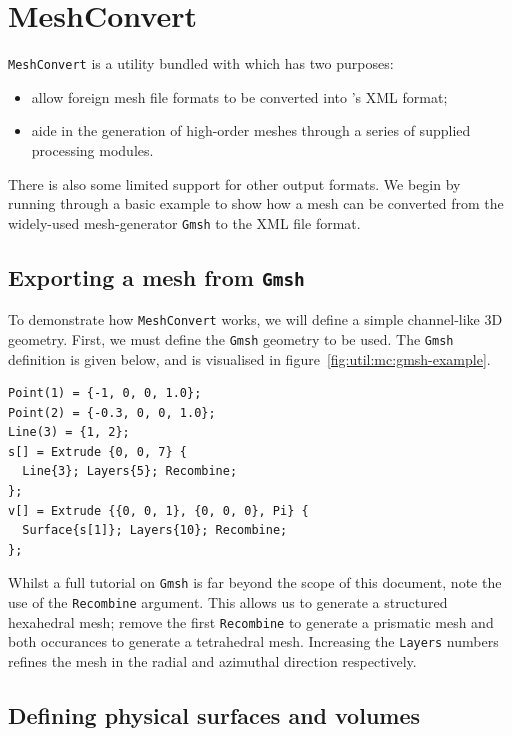 \section{MeshConvert}
\label{s:utilities:meshconvert}

\newcommand{\mc}{\texttt{MeshConvert}\xspace}
\newcommand{\gmsh}{\texttt{Gmsh}\xspace}

\mc is a utility bundled with \nekpp which has two purposes:
\begin{itemize}
  \item allow foreign mesh file formats to be converted into \nekpp's XML
  format;
  \item aide in the generation of high-order meshes through a series of supplied
  processing modules.
\end{itemize}

There is also some limited support for other output formats. We begin by running
through a basic example to show how a mesh can be converted from the widely-used
mesh-generator \gmsh to the XML file format.

\subsection{Exporting a mesh from \gmsh}

To demonstrate how \mc works, we will define a simple channel-like 3D geometry.
First, we must define the \gmsh geometry to be used. The \gmsh definition is
given below, and is visualised in figure~\ref{fig:util:mc:gmsh-example}.

\begin{lstlisting}[style=XmlStyle]
Point(1) = {-1, 0, 0, 1.0};
Point(2) = {-0.3, 0, 0, 1.0};
Line(3) = {1, 2};
s[] = Extrude {0, 0, 7} {
  Line{3}; Layers{5}; Recombine;
};
v[] = Extrude {{0, 0, 1}, {0, 0, 0}, Pi} {
  Surface{s[1]}; Layers{10}; Recombine;
};
\end{lstlisting}

Whilst a full tutorial on \gmsh is far beyond the scope of this document, note
the use of the \texttt{Recombine} argument. This allows us to generate a
structured hexahedral mesh; remove the first \texttt{Recombine} to generate a
prismatic mesh and both occurances to generate a tetrahedral mesh. Increasing
the \texttt{Layers} numbers refines the mesh in the radial and azimuthal
direction respectively.

\subsection{Defining physical surfaces and volumes}

